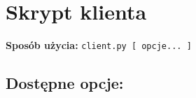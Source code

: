


\subtitle{Dokumentacja użytkownika}
\maketitle

\tableofcontents
\vfill
\pagebreak

\section{Skrypt klienta}

  \textbf{Sposób użycia:}
  \texttt{client.py [ opcje... ]}

  \subsection{Dostępne opcje:}
